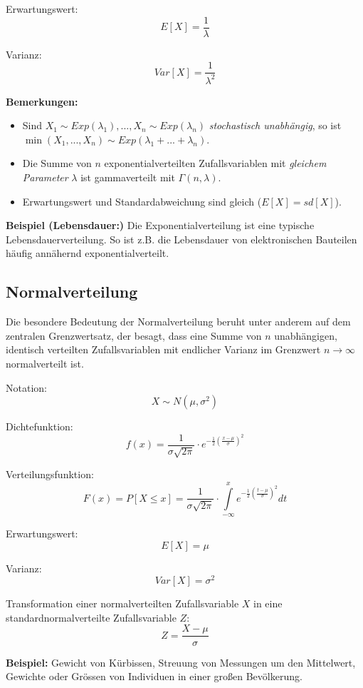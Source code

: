 \documentclass[10pt,a4paper,twocolumn]{article}
\begin{document}
Erwartungswert:
\[
E[X]=\frac{1}{\lambda}
\]

Varianz:
\[
Var[X]=\frac{1}{\lambda^{2}}
\]

\textbf{Bemerkungen:}
\begin{itemize}
\item Sind $X_1\sim Exp(\lambda_1), ..., X_n\sim Exp(\lambda_n)$ \emph{stochastisch unabhängig}, so ist $\min(X_1, ...,X_n)\sim Exp(\lambda_1+...+\lambda_n)$.
\item Die Summe von $n$ exponentialverteilten Zufallsvariablen mit \emph{gleichem Parameter} $\lambda$ ist gammaverteilt mit $\Gamma(n,\lambda)$.
\item Erwartungswert und Standardabweichung sind gleich ($E[X]=sd[X]$).
\end{itemize}

\textbf{Beispiel (Lebensdauer:)} Die Exponentialverteilung ist eine typische Lebensdauerverteilung. So ist z.B. die Lebensdauer von elektronischen Bauteilen häufig annähernd exponentialverteilt.

\subsection{Normalverteilung}
Die besondere Bedeutung der Normalverteilung beruht unter anderem auf dem zentralen Grenzwertsatz, der besagt, dass eine Summe von $n$ unabhängigen, identisch verteilten Zufallsvariablen mit endlicher Varianz im Grenzwert $n\rightarrow\infty$ normalverteilt ist.

\vspace{10pt}

Notation:
\[
X \sim N(\mu, \sigma^2)
\]

Dichtefunktion:
\[
f(x)=\frac{1}{\sigma \sqrt{2 \pi}}\cdot e^{-\frac{1}{2}\left(\frac{x-\mu}{\sigma}\right)^2}
\]

Verteilungsfunktion:
\[
F(x)=P[X \leq x]=\frac{1}{\sigma \sqrt{2 \pi}}\cdot\int\limits_{-\infty}^x e^{-\frac{1}{2}\left(\frac{t-\mu}{\sigma} \right)^2}dt
\]

Erwartungswert:
\[
E[X]=\mu
\]

Varianz:
\[
Var[X]=\sigma^2
\]

Transformation einer normalverteilten Zufallsvariable $X$ in eine standardnormalverteilte Zufallsvariable $Z$:
\[
Z=\frac{X-\mu}{\sigma}
\]

\textbf{Beispiel:} Gewicht von Kürbissen, Streuung von Messungen um den Mittelwert, Gewichte oder Grössen von Individuen in einer großen Bevölkerung.
\end{document}
